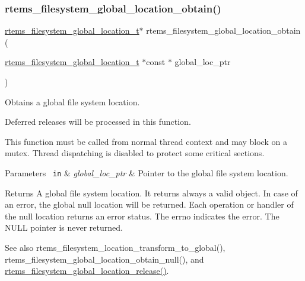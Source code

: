 \subsubsection{\texorpdfstring{rtems\_filesystem\_global\_location\_obtain()}{rtems\_filesystem\_global\_location\_obtain()}}
{\footnotesize\ttfamily \mbox{\hyperlink{structrtems__filesystem__global__location__t}{rtems\+\_\+filesystem\+\_\+global\+\_\+location\+\_\+t}}$\ast$ rtems\+\_\+filesystem\+\_\+global\+\_\+location\+\_\+obtain (\begin{DoxyParamCaption}\item[{\mbox{\hyperlink{structrtems__filesystem__global__location__t}{rtems\+\_\+filesystem\+\_\+global\+\_\+location\+\_\+t}} $\ast$const $\ast$}]{global\+\_\+loc\+\_\+ptr }\end{DoxyParamCaption})}



Obtains a global file system location. 

Deferred releases will be processed in this function.

This function must be called from normal thread context and may block on a mutex. Thread dispatching is disabled to protect some critical sections.


\begin{DoxyParams}[1]{Parameters}
\mbox{\texttt{ in}}  & {\em global\+\_\+loc\+\_\+ptr} & Pointer to the global file system location.\\
\hline
\end{DoxyParams}
\begin{DoxyReturn}{Returns}
A global file system location. It returns always a valid object. In case of an error, the global null location will be returned. Each operation or handler of the null location returns an error status. The errno indicates the error. The N\+U\+LL pointer is never returned.
\end{DoxyReturn}
\begin{DoxySeeAlso}{See also}
rtems\+\_\+filesystem\+\_\+location\+\_\+transform\+\_\+to\+\_\+global(), rtems\+\_\+filesystem\+\_\+global\+\_\+location\+\_\+obtain\+\_\+null(), and \mbox{\hyperlink{group__LibIOInternal_ga66aa5e6d0bbf4c03b533deac66fb328f}{rtems\+\_\+filesystem\+\_\+global\+\_\+location\+\_\+release()}}. 
\end{DoxySeeAlso}
\mbox{\label{group__LibIOInternal_ga66aa5e6d0bbf4c03b533deac66fb328f}} 
